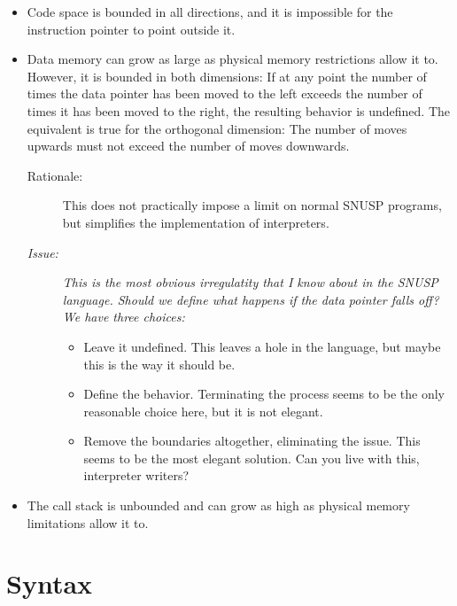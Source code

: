 \documentclass[a4paper]{article}
\newcommand\comment[2]{\begin{description} \item[#1] #2 \end{description}}
\newcommand\rationale[1]{\comment{Rationale:}{#1}}
\newcommand\issue[1]{{\comment{\textit{Issue:}}{\it #1}}}
\begin{document}
\begin{itemize}

\item Code space is bounded in all directions, and it is impossible for the
instruction pointer to point outside it.

\item Data memory can grow as large as physical memory restrictions allow it
to.  However, it is bounded in both dimensions:  If at any point the number of
times the data pointer has been moved to the left exceeds the number of times
it has been moved to the right, the resulting behavior is undefined.  The
equivalent is true for the orthogonal dimension: The number of moves upwards
must not exceed the number of moves downwards.

\rationale{This does not practically impose a limit on normal \textsc{SNUSP}
programs, but simplifies the implementation of interpreters.}

\issue{This is the most obvious irregulatity that I know about in the SNUSP
language.  Should we define what happens if the data pointer falls off?  We
have three choices:

\begin{itemize}

\item Leave it undefined.  This leaves a hole in the language, but maybe this
is the way it should be.

\item Define the behavior.  Terminating the process seems to be the only
reasonable choice here, but it is not elegant.

\item Remove the boundaries altogether, eliminating the issue.  This seems
to be the most elegant solution.  Can you live with this, interpreter writers?

\end{itemize}}

\item The call stack is unbounded and can grow as high as physical memory
limitations allow it to.

\end{itemize}




\section{Syntax}
\end{document}
